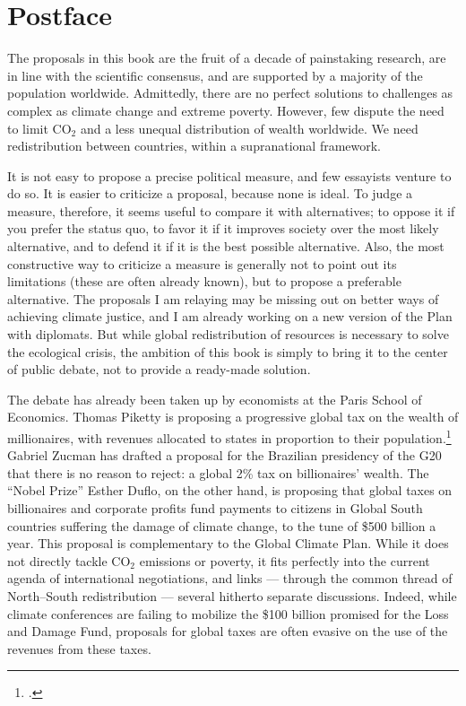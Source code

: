 \documentclass[a5paper,english,openany]{memoir}
\begin{document}
\chapter{Postface}

The proposals in this book are the fruit of a decade of painstaking research, are in line with the scientific consensus, and are supported by a majority of the population worldwide. 
Admittedly, there are no perfect solutions to challenges as complex as climate change and extreme poverty. 
However, few dispute the need to limit CO$_\text{2}$ and %
a less unequal distribution of wealth worldwide. We need redistribution between countries, within a supranational framework. 

It is not easy to propose a precise political measure, and few essayists venture to do so. It is easier to criticize a proposal, because none is ideal. To judge a measure, therefore, it seems useful to compare it with alternatives; to oppose it if you prefer the status quo, to favor it if it improves society over the most likely alternative, and to defend it if it is the best possible alternative. Also, the most constructive way to criticize a measure is generally not to point out its limitations (these are often already known), but to propose a preferable alternative. 
The proposals I am relaying may be missing out on better ways of achieving climate justice, and I am already working on a new version of the Plan with diplomats. 
But while global redistribution of resources is necessary to solve the ecological crisis, the ambition of this book is simply to bring it to the center of public debate, not to provide a ready-made solution. 

The debate has already been taken up by economists at the Paris School of Economics. Thomas Piketty is proposing a progressive global tax on the wealth of millionaires, with revenues allocated to states in proportion to their population.\footnote{\citet{piketty_brief_2022}.} 
Gabriel Zucman has drafted a proposal for the Brazilian presidency of the G20 that there is no reason to reject: a global 2\% tax on billionaires' wealth. %
The ``Nobel Prize'' Esther Duflo, on the other hand, is proposing that global taxes on billionaires and corporate profits fund payments to citizens in Global South countries suffering the damage of climate change, to the tune of \$500 billion a year. This proposal is complementary to the Global Climate Plan. While it does not directly tackle CO$_\text{2}$ emissions or poverty, it fits perfectly into the current agenda of international negotiations, and links --- through the common thread of North--South redistribution --- several hitherto separate discussions. Indeed, while climate conferences are failing to mobilize the \$100 billion promised for the Loss and Damage Fund, proposals for global taxes are often evasive on the use of the revenues from these taxes. 
\end{document}

